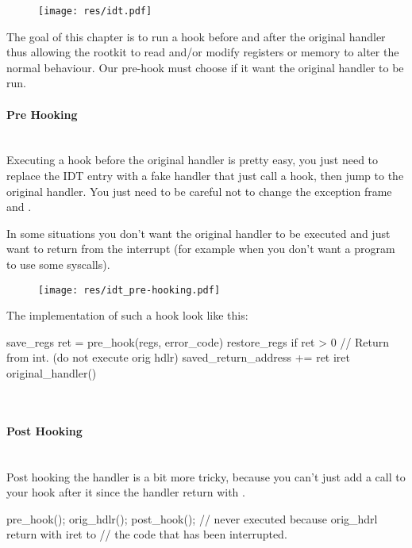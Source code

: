 \begin{figure}[h]
  \centering
  \texttt{[image: res/idt.pdf]}
\end{figure}

The goal of this chapter is to run a hook before and after the original handler
thus allowing the rootkit to read and/or modify registers or memory to alter
the normal behaviour. Our pre-hook must choose if it want the original handler
to be run.

\paragraph{Pre Hooking}\mbox{}\\
Executing a hook before the original handler is pretty easy, you just need
to replace the IDT entry with a fake handler that just call a hook, then jump
to the original handler. You just need to be careful not to change the
exception frame and .

In some situations you don't want the original handler to be executed and just
want to return from the interrupt (for example when you don't want a program
to use some syscalls).

\begin{figure}[h]
  \centering
  \texttt{[image: res/idt\_pre-hooking.pdf]}
\end{figure}

The implementation of such a hook look like this:

\begin{pseudocode}
save_regs
ret = pre_hook(regs, error_code)
restore_regs
if ret > 0  // Return from int. (do not execute orig hdlr)
    saved_return_address += ret
    iret
original_handler()
\end{pseudocode}\\

\paragraph{Post Hooking}\mbox{}\\
Post hooking the handler is a bit more tricky, because you can't just add
a call to your hook after it since the handler return with .
\\
\begin{pseudocode}
pre_hook();
orig_hdlr();
post_hook(); // never executed because orig_hdrl return with iret to
             // the code that has been interrupted.
\end{pseudocode}
\\

